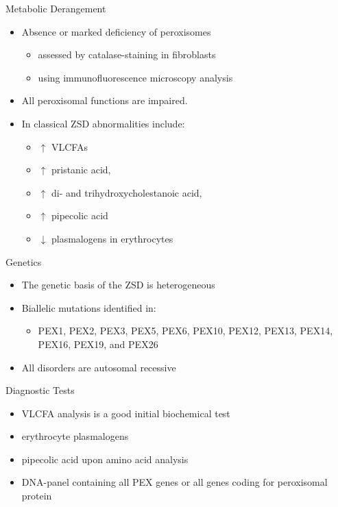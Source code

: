 \documentclass[presentation, smaller]{beamer}
\begin{document}
\begin{frame}[label={sec:orgd22c658}]{Metabolic Derangement}
\begin{itemize}
\item Absence or marked deficiency of peroxisomes
\begin{itemize}
\item assessed by catalase-staining in fibroblasts
\item using immunofluorescence microscopy analysis
\end{itemize}
\item All peroxisomal functions are impaired.
\item In classical ZSD abnormalities include:
\begin{itemize}
\item \(\uparrow\) VLCFAs
\item \(\uparrow\) pristanic acid,
\item \(\uparrow\) di- and trihydroxycholestanoic acid,
\item \(\uparrow\) pipecolic acid
\item \(\downarrow\) plasmalogens in erythrocytes
\end{itemize}
\end{itemize}
\end{frame}

\begin{frame}[label={sec:orgf62a90c}]{Genetics}
\begin{itemize}
\item The genetic basis of the ZSD is heterogeneous
\item Biallelic mutations identified in:
\begin{itemize}
\item PEX1, PEX2, PEX3, PEX5, PEX6, PEX10, PEX12, PEX13, PEX14, PEX16, PEX19, and PEX26
\end{itemize}
\item All disorders are autosomal recessive
\end{itemize}
\end{frame}

\begin{frame}[label={sec:org2405c80}]{Diagnostic Tests}
\begin{itemize}
\item VLCFA analysis is a good initial biochemical test
\item erythrocyte plasmalogens
\item pipecolic acid upon amino acid analysis
\item DNA-panel containing all PEX genes or all genes coding for
peroxisomal protein
\end{itemize}
\end{frame}
\end{document}
